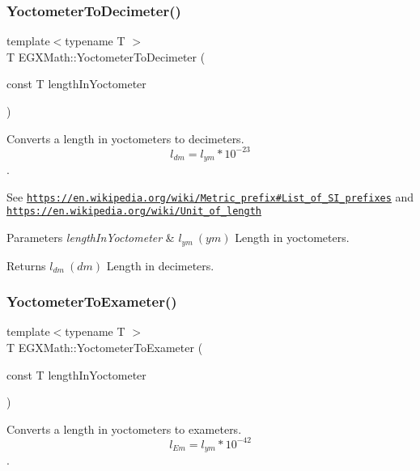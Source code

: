\subsubsection{\texorpdfstring{Yoctometer\+To\+Decimeter()}{YoctometerToDecimeter()}}
{\footnotesize\ttfamily template$<$typename T $>$ \\
T E\+G\+X\+Math\+::\+Yoctometer\+To\+Decimeter (\begin{DoxyParamCaption}\item[{const T}]{length\+In\+Yoctometer }\end{DoxyParamCaption})}



Converts a length in yoctometers to decimeters. \[ l_{dm}=l_{ym} * 10^{-23} \]. 

See \href{https://en.wikipedia.org/wiki/Metric_prefix#List_of_SI_prefixes}{\tt https\+://en.\+wikipedia.\+org/wiki/\+Metric\+\_\+prefix\#\+List\+\_\+of\+\_\+\+S\+I\+\_\+prefixes} and \href{https://en.wikipedia.org/wiki/Unit_of_length}{\tt https\+://en.\+wikipedia.\+org/wiki/\+Unit\+\_\+of\+\_\+length} 
\begin{DoxyParams}{Parameters}
{\em length\+In\+Yoctometer} & $ l_{ym}\ (ym)$ Length in yoctometers. \\
\hline
\end{DoxyParams}
\begin{DoxyReturn}{Returns}
$ l_{dm}\ (dm)$ Length in decimeters. 
\end{DoxyReturn}
\mbox{\label{group___e_g_x_math-_conversions-_length_conversions-_yoctometer-_s_i_ga2ffb14b252f7cc426a761de3930449a1}} 
\subsubsection{\texorpdfstring{Yoctometer\+To\+Exameter()}{YoctometerToExameter()}}
{\footnotesize\ttfamily template$<$typename T $>$ \\
T E\+G\+X\+Math\+::\+Yoctometer\+To\+Exameter (\begin{DoxyParamCaption}\item[{const T}]{length\+In\+Yoctometer }\end{DoxyParamCaption})}



Converts a length in yoctometers to exameters. \[ l_{Em}=l_{ym} * 10^{-42} \]. 


